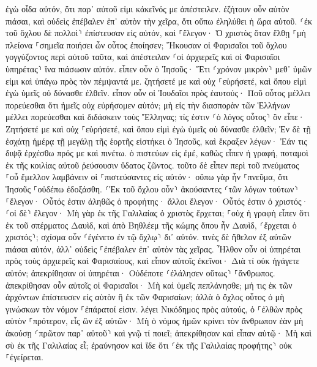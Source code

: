 \documentclass[twoside, 9pt]{extreport}
\begin{document}
ἐγὼ οἶδα αὐτόν, ὅτι παρ᾽ αὐτοῦ εἰμι κἀκεῖνός με ἀπέστειλεν. 
ἐζήτουν οὖν αὐτὸν πιάσαι, καὶ οὐδεὶς ἐπέβαλεν ἐπ᾽ αὐτὸν τὴν χεῖρα, ὅτι οὔπω ἐληλύθει ἡ ὥρα αὐτοῦ. 
⸂ἐκ τοῦ ὄχλου δὲ πολλοὶ⸃ ἐπίστευσαν εἰς αὐτόν, καὶ ⸀ἔλεγον· Ὁ χριστὸς ὅταν ἔλθῃ ⸀μὴ πλείονα ⸀σημεῖα ποιήσει ὧν οὗτος ἐποίησεν; 
Ἤκουσαν οἱ Φαρισαῖοι τοῦ ὄχλου γογγύζοντος περὶ αὐτοῦ ταῦτα, καὶ ἀπέστειλαν ⸂οἱ ἀρχιερεῖς καὶ οἱ Φαρισαῖοι ὑπηρέτας⸃ ἵνα πιάσωσιν αὐτόν. 
εἶπεν οὖν ὁ Ἰησοῦς· Ἔτι ⸂χρόνον μικρὸν⸃ μεθ᾽ ὑμῶν εἰμι καὶ ὑπάγω πρὸς τὸν πέμψαντά με. 
ζητήσετέ με καὶ οὐχ ⸀εὑρήσετέ, καὶ ὅπου εἰμὶ ἐγὼ ὑμεῖς οὐ δύνασθε ἐλθεῖν. 
εἶπον οὖν οἱ Ἰουδαῖοι πρὸς ἑαυτούς· Ποῦ οὗτος μέλλει πορεύεσθαι ὅτι ἡμεῖς οὐχ εὑρήσομεν αὐτόν; μὴ εἰς τὴν διασπορὰν τῶν Ἑλλήνων μέλλει πορεύεσθαι καὶ διδάσκειν τοὺς Ἕλληνας; 
τίς ἐστιν ⸂ὁ λόγος οὗτος⸃ ὃν εἶπε· Ζητήσετέ με καὶ οὐχ ⸀εὑρήσετέ, καὶ ὅπου εἰμὶ ἐγὼ ὑμεῖς οὐ δύνασθε ἐλθεῖν; 
Ἐν δὲ τῇ ἐσχάτῃ ἡμέρᾳ τῇ μεγάλῃ τῆς ἑορτῆς εἱστήκει ὁ Ἰησοῦς, καὶ ἔκραξεν λέγων· Ἐάν τις διψᾷ ἐρχέσθω πρός με καὶ πινέτω. 
ὁ πιστεύων εἰς ἐμέ, καθὼς εἶπεν ἡ γραφή, ποταμοὶ ἐκ τῆς κοιλίας αὐτοῦ ῥεύσουσιν ὕδατος ζῶντος. 
τοῦτο δὲ εἶπεν περὶ τοῦ πνεύματος ⸀οὗ ἔμελλον λαμβάνειν οἱ ⸀πιστεύσαντες εἰς αὐτόν· οὔπω γὰρ ἦν ⸀πνεῦμα, ὅτι Ἰησοῦς ⸀οὐδέπω ἐδοξάσθη. 
⸂Ἐκ τοῦ ὄχλου οὖν⸃ ἀκούσαντες ⸂τῶν λόγων τούτων⸃ ⸀ἔλεγον· Οὗτός ἐστιν ἀληθῶς ὁ προφήτης· 
ἄλλοι ἔλεγον· Οὗτός ἐστιν ὁ χριστός· ⸂οἱ δὲ⸃ ἔλεγον· Μὴ γὰρ ἐκ τῆς Γαλιλαίας ὁ χριστὸς ἔρχεται; 
⸀οὐχ ἡ γραφὴ εἶπεν ὅτι ἐκ τοῦ σπέρματος Δαυὶδ, καὶ ἀπὸ Βηθλέεμ τῆς κώμης ὅπου ἦν Δαυὶδ, ⸂ἔρχεται ὁ χριστός⸃; 
σχίσμα οὖν ⸂ἐγένετο ἐν τῷ ὄχλῳ⸃ δι᾽ αὐτόν. 
τινὲς δὲ ἤθελον ἐξ αὐτῶν πιάσαι αὐτόν, ἀλλ᾽ οὐδεὶς ⸀ἐπέβαλεν ἐπ᾽ αὐτὸν τὰς χεῖρας. 
Ἦλθον οὖν οἱ ὑπηρέται πρὸς τοὺς ἀρχιερεῖς καὶ Φαρισαίους, καὶ εἶπον αὐτοῖς ἐκεῖνοι· Διὰ τί οὐκ ἠγάγετε αὐτόν; 
ἀπεκρίθησαν οἱ ὑπηρέται· Οὐδέποτε ⸂ἐλάλησεν οὕτως⸃ ⸀ἄνθρωπος. 
ἀπεκρίθησαν οὖν αὐτοῖς οἱ Φαρισαῖοι· Μὴ καὶ ὑμεῖς πεπλάνησθε; 
μή τις ἐκ τῶν ἀρχόντων ἐπίστευσεν εἰς αὐτὸν ἢ ἐκ τῶν Φαρισαίων; 
ἀλλὰ ὁ ὄχλος οὗτος ὁ μὴ γινώσκων τὸν νόμον ⸀ἐπάρατοί εἰσιν. 
λέγει Νικόδημος πρὸς αὐτούς, ὁ ⸀ἐλθὼν πρὸς αὐτὸν ⸀πρότερον, εἷς ὢν ἐξ αὐτῶν· 
Μὴ ὁ νόμος ἡμῶν κρίνει τὸν ἄνθρωπον ἐὰν μὴ ἀκούσῃ ⸂πρῶτον παρ᾽ αὐτοῦ⸃ καὶ γνῷ τί ποιεῖ; 
ἀπεκρίθησαν καὶ εἶπαν αὐτῷ· Μὴ καὶ σὺ ἐκ τῆς Γαλιλαίας εἶ; ἐραύνησον καὶ ἴδε ὅτι ⸂ἐκ τῆς Γαλιλαίας προφήτης⸃ οὐκ ⸀ἐγείρεται. 
\end{document}
